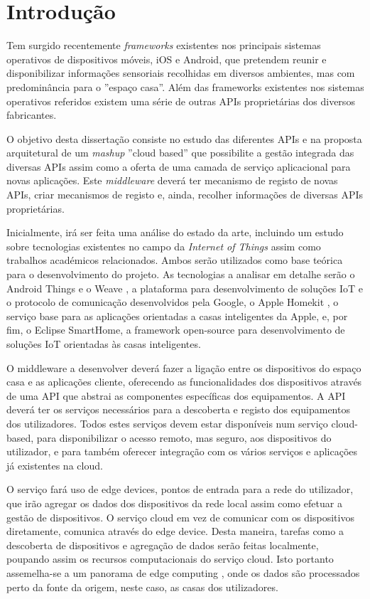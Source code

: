 \setcounter{page}{1}

\chapter{Introdução}
Tem surgido recentemente \textit{frameworks} existentes nos principais sistemas operativos de dispositivos móveis, iOS e Android, que pretendem reunir e disponibilizar informações sensoriais recolhidas em diversos ambientes, mas com predominância para o ''espaço casa''.
Além das frameworks existentes nos sistemas operativos referidos existem uma série de outras APIs proprietárias dos diversos fabricantes.

O objetivo desta dissertação consiste no estudo das diferentes APIs e na proposta arquitetural de um \textit{mashup} ''cloud based'' que possibilite a gestão integrada das diversas APIs assim como a oferta de uma camada de serviço aplicacional para novas aplicações.
Este \textit{middleware} deverá ter mecanismo de registo de novas APIs, criar mecanismos de registo e, ainda, recolher informações de diversas APIs proprietárias.

Inicialmente, irá ser feita uma análise do estado da arte, incluindo  um estudo sobre tecnologias existentes no campo da \textit{Internet of Things} assim como trabalhos académicos relacionados. Ambos serão utilizados como base teórica para o desenvolvimento do projeto. As tecnologias a analisar em detalhe serão o Android Things e o Weave \cite{android-things}, a plataforma para desenvolvimento de soluções IoT e o protocolo de comunicação desenvolvidos pela Google, o Apple Homekit \cite{homekit}, o serviço base para as aplicações orientadas a casas inteligentes da Apple, e, por fim, o Eclipse SmartHome, a framework open-source para desenvolvimento de soluções IoT orientadas às casas inteligentes.

O middleware a desenvolver deverá fazer a ligação entre os dispositivos do espaço casa e as aplicações cliente, oferecendo as funcionalidades dos dispositivos através de uma API que abstrai as componentes específicas dos equipamentos. A API deverá ter os serviços necessários para a descoberta e registo dos equipamentos dos utilizadores. Todos estes serviços devem estar disponíveis num serviço cloud-based, para disponibilizar o acesso remoto, mas seguro, aos dispositivos do utilizador, e para também oferecer integração com os vários serviços e aplicações já existentes na cloud.

O serviço fará uso de edge devices, pontos de entrada para a rede do utilizador, que irão agregar os dados dos dispositivos da rede local assim como efetuar a gestão de dispositivos. O serviço cloud em vez de comunicar com os dispositivos diretamente, comunica através do edge device. Desta maneira, tarefas como a descoberta de dispositivos e agregação de dados serão feitas localmente, poupando assim os recursos computacionais do serviço cloud. Isto portanto assemelha-se a um panorama de edge computing \cite{edge}, onde os dados são processados perto da fonte da origem, neste caso, as casas dos utilizadores.

